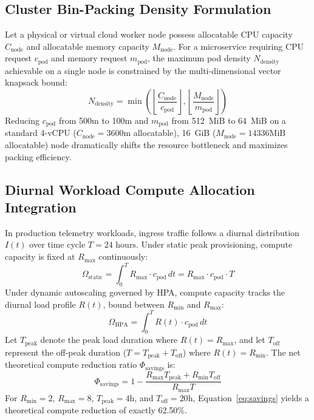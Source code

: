 \documentclass[conference]{IEEEtran}
\begin{document}
\subsection{Cluster Bin-Packing Density Formulation}
Let a physical or virtual cloud worker node possess allocatable CPU capacity $C_{\text{node}}$ and allocatable memory capacity $M_{\text{node}}$. For a microservice requiring CPU request $c_{\text{pod}}$ and memory request $m_{\text{pod}}$, the maximum pod density $N_{\text{density}}$ achievable on a single node is constrained by the multi-dimensional vector knapsack bound:
\begin{equation}
N_{\text{density}} = \min\left( \left\lfloor \frac{C_{\text{node}}}{c_{\text{pod}}} \right\rfloor, \left\lfloor \frac{M_{\text{node}}}{m_{\text{pod}}} \right\rfloor \right)
\label{eq:density}
\end{equation}
Reducing $c_{\text{pod}}$ from 500m to 100m and $m_{\text{pod}}$ from 512~MiB to 64~MiB on a standard 4-vCPU ($C_{\text{node}} = 3600\text{m}$ allocatable), 16~GiB ($M_{\text{node}} = 14336\text{MiB}$ allocatable) node dramatically shifts the resource bottleneck and maximizes packing efficiency.

\subsection{Diurnal Workload Compute Allocation Integration}
In production telemetry workloads, ingress traffic follows a diurnal distribution $I(t)$ over time cycle $T = 24\text{ hours}$. Under static peak provisioning, compute capacity is fixed at $R_{\text{max}}$ continuously:
\begin{equation}
\Omega_{\text{static}} = \int_{0}^{T} R_{\text{max}} \cdot c_{\text{pod}} \, dt = R_{\text{max}} \cdot c_{\text{pod}} \cdot T
\end{equation}
Under dynamic autoscaling governed by HPA, compute capacity tracks the diurnal load profile $R(t)$, bound between $R_{\text{min}}$ and $R_{\text{max}}$:
\begin{equation}
\Omega_{\text{HPA}} = \int_{0}^{T} R(t) \cdot c_{\text{pod}} \, dt
\end{equation}
Let $T_{\text{peak}}$ denote the peak load duration where $R(t) = R_{\text{max}}$, and let $T_{\text{off}}$ represent the off-peak duration ($T = T_{\text{peak}} + T_{\text{off}}$) where $R(t) = R_{\text{min}}$. The net theoretical compute reduction ratio $\Phi_{\text{savings}}$ is:
\begin{equation}
\Phi_{\text{savings}} = 1 - \frac{R_{\text{max}} T_{\text{peak}} + R_{\text{min}} T_{\text{off}}}{R_{\text{max}} T}
\label{eq:savings}
\end{equation}
For $R_{\text{min}} = 2$, $R_{\text{max}} = 8$, $T_{\text{peak}} = 4\text{h}$, and $T_{\text{off}} = 20\text{h}$, Equation~\ref{eq:savings} yields a theoretical compute reduction of exactly 62.50\%.
\end{document}
